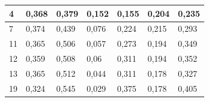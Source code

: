 \documentclass{classrep}
\begin{document}
{\begin{table}[H]
\begin{center}
\begin{tabular}{|l|l|l|l|l|l|l|}
4                                                                  & 0,368                                                        & 0,379                                                           & 0,152                                                            & 0,155                                                               & 0,204                                                           & 0,235                                                              \\ \hline
7                                                                  & 0,374                                                        & 0,439                                                           & 0,076                                                            & 0,224                                                               & 0,215                                                           & 0,293                                                              \\ \hline
11                                                                 & 0,365                                                        & 0,506                                                           & 0,057                                                            & 0,273                                                               & 0,194                                                           & 0,349                                                              \\ \hline
12                                                                 & 0,359                                                        & 0,508                                                           & 0,06                                                             & 0,311                                                               & 0,194                                                           & 0,352                                                              \\ \hline
13                                                                 & 0,365                                                        & 0,512                                                           & 0,044                                                            & 0,311                                                               & 0,178                                                           & 0,327                                                              \\ \hline
19                                                                 & 0,324                                                        & 0,545                                                           & 0,029                                                            & 0,375                                                               & 0,178                                                           & 0,405                                                              \\ \hline

\end{tabular}
\end{center}
\end{table}}
\end{document}
